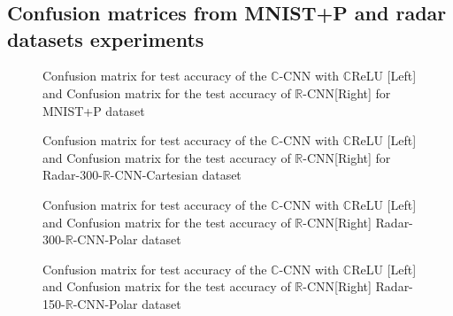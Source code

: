 \chapter{}

\section{Confusion matrices from MNIST+P and radar datasets experiments}\label{apb}


\begin{figure}[h]
	\centering
	\epsfxsize=6cm
	{}{}\caption{ Confusion matrix for test accuracy of the $\mathbb{C}$-CNN with $\mathbb{C}$ReLU [Left] and Confusion matrix for the test accuracy of $\mathbb{R}$-CNN[Right] for MNIST+P dataset}
	\label{fig:mnistconfs}
\end{figure} 

\begin{figure}[h]
	\centering
	\epsfxsize=6cm
	
	{}{}\caption{ Confusion matrix for test accuracy of the $\mathbb{C}$-CNN with $\mathbb{C}$ReLU [Left] and Confusion matrix for the test accuracy of $\mathbb{R}$-CNN[Right] for Radar-300-$\mathbb{R}$-CNN-Cartesian dataset}
		\centering
	\label{fig:confusionradar}
\end{figure}

\begin{figure}[h]
	\centering
	\epsfxsize=6cm
	\epsfxsize=6cm
	{}{}\caption{ Confusion matrix for test accuracy of the $\mathbb{C}$-CNN with $\mathbb{C}$ReLU [Left] and Confusion matrix for the test accuracy of $\mathbb{R}$-CNN[Right] Radar-300-$\mathbb{R}$-CNN-Polar dataset}
		\centering
	\label{fig:confusionradar}
\end{figure}

\begin{figure}[h]
	\centering
	\epsfxsize=6cm
	{}{}\caption{ Confusion matrix for test accuracy of the $\mathbb{C}$-CNN with $\mathbb{C}$ReLU [Left] and Confusion matrix for the test accuracy of $\mathbb{R}$-CNN[Right] Radar-150-$\mathbb{R}$-CNN-Polar dataset}
	\centering
\label{fig:confusionradar}
\end{figure}